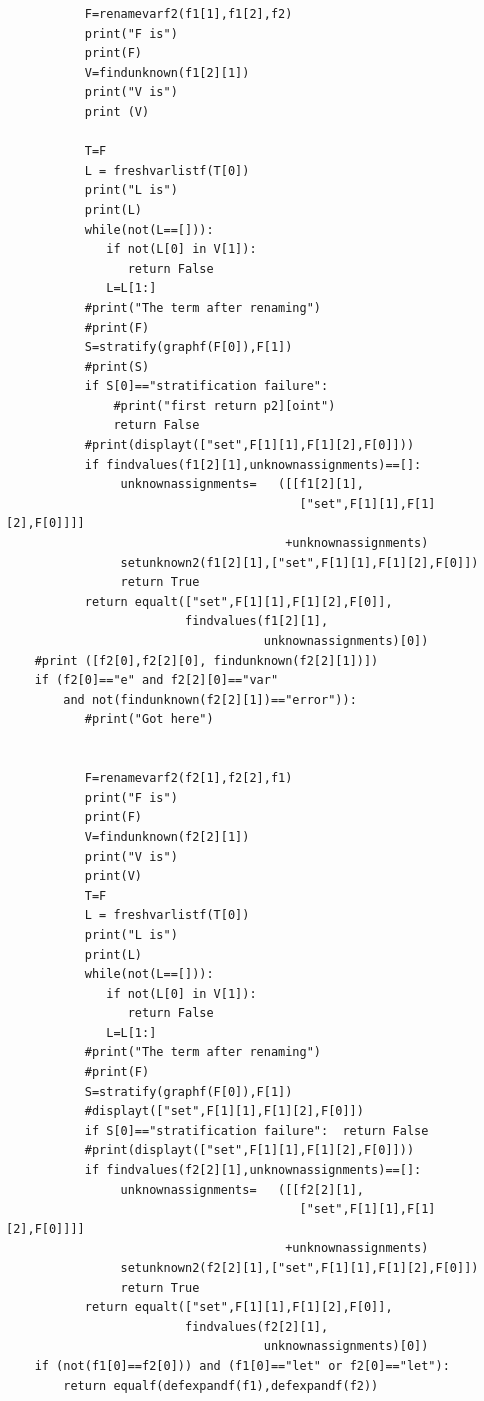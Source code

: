 \documentclass{article}
\begin{document}
\begin{verbatim}
           F=renamevarf2(f1[1],f1[2],f2)
           print("F is")
           print(F)
           V=findunknown(f1[2][1])
           print("V is")
           print (V)
           
           T=F
           L = freshvarlistf(T[0])
           print("L is")
           print(L)
           while(not(L==[])):
              if not(L[0] in V[1]):
                 return False
              L=L[1:]
           #print("The term after renaming")
           #print(F)
           S=stratify(graphf(F[0]),F[1])
           #print(S)
           if S[0]=="stratification failure":
               #print("first return p2][oint")
               return False
           #print(displayt(["set",F[1][1],F[1][2],F[0]]))
           if findvalues(f1[2][1],unknownassignments)==[]:
                unknownassignments=   ([[f1[2][1],
                                         ["set",F[1][1],F[1][2],F[0]]]]
                                       +unknownassignments)        
                setunknown2(f1[2][1],["set",F[1][1],F[1][2],F[0]])
                return True
           return equalt(["set",F[1][1],F[1][2],F[0]],
                         findvalues(f1[2][1],
                                    unknownassignments)[0])
    #print ([f2[0],f2[2][0], findunknown(f2[2][1])])    
    if (f2[0]=="e" and f2[2][0]=="var"
        and not(findunknown(f2[2][1])=="error")):
           #print("Got here")


           F=renamevarf2(f2[1],f2[2],f1)
           print("F is")
           print(F)
           V=findunknown(f2[2][1])
           print("V is")
           print(V)
           T=F
           L = freshvarlistf(T[0])
           print("L is")
           print(L)
           while(not(L==[])):
              if not(L[0] in V[1]):
                 return False
              L=L[1:]
           #print("The term after renaming")
           #print(F)           
           S=stratify(graphf(F[0]),F[1])
           #displayt(["set",F[1][1],F[1][2],F[0]])          
           if S[0]=="stratification failure":  return False
           #print(displayt(["set",F[1][1],F[1][2],F[0]]))
           if findvalues(f2[2][1],unknownassignments)==[]:
                unknownassignments=   ([[f2[2][1],
                                         ["set",F[1][1],F[1][2],F[0]]]]
                                       +unknownassignments)
                setunknown2(f2[2][1],["set",F[1][1],F[1][2],F[0]])
                return True
           return equalt(["set",F[1][1],F[1][2],F[0]],
                         findvalues(f2[2][1],
                                    unknownassignments)[0])            
    if (not(f1[0]==f2[0])) and (f1[0]=="let" or f2[0]=="let"):
        return equalf(defexpandf(f1),defexpandf(f2))


\end{verbatim}
\end{document}
